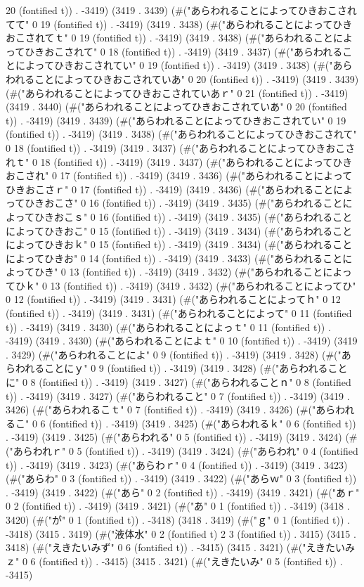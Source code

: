 20 (fontified t)) . -3419) (3419 . 3439) (#("あらわれることによってひきおこされてて" 0 19 (fontified t)) . -3419) (3419 . 3438) (#("あらわれることによってひきおこされてｔ" 0 19 (fontified t)) . -3419) (3419 . 3438) (#("あらわれることによってひきおこされて" 0 18 (fontified t)) . -3419) (3419 . 3437) (#("あらわれることによってひきおこされてい" 0 19 (fontified t)) . -3419) (3419 . 3438) (#("あらわれることによってひきおこされていあ" 0 20 (fontified t)) . -3419) (3419 . 3439) (#("あらわれることによってひきおこされていあｒ" 0 21 (fontified t)) . -3419) (3419 . 3440) (#("あらわれることによってひきおこされていあ" 0 20 (fontified t)) . -3419) (3419 . 3439) (#("あらわれることによってひきおこされてい" 0 19 (fontified t)) . -3419) (3419 . 3438) (#("あらわれることによってひきおこされて" 0 18 (fontified t)) . -3419) (3419 . 3437) (#("あらわれることによってひきおこされｔ" 0 18 (fontified t)) . -3419) (3419 . 3437) (#("あらわれることによってひきおこされ" 0 17 (fontified t)) . -3419) (3419 . 3436) (#("あらわれることによってひきおこさｒ" 0 17 (fontified t)) . -3419) (3419 . 3436) (#("あらわれることによってひきおこさ" 0 16 (fontified t)) . -3419) (3419 . 3435) (#("あらわれることによってひきおこｓ" 0 16 (fontified t)) . -3419) (3419 . 3435) (#("あらわれることによってひきおこ" 0 15 (fontified t)) . -3419) (3419 . 3434) (#("あらわれることによってひきおｋ" 0 15 (fontified t)) . -3419) (3419 . 3434) (#("あらわれることによってひきお" 0 14 (fontified t)) . -3419) (3419 . 3433) (#("あらわれることによってひき" 0 13 (fontified t)) . -3419) (3419 . 3432) (#("あらわれることによってひｋ" 0 13 (fontified t)) . -3419) (3419 . 3432) (#("あらわれることによってひ" 0 12 (fontified t)) . -3419) (3419 . 3431) (#("あらわれることによってｈ" 0 12 (fontified t)) . -3419) (3419 . 3431) (#("あらわれることによって" 0 11 (fontified t)) . -3419) (3419 . 3430) (#("あらわれることによっｔ" 0 11 (fontified t)) . -3419) (3419 . 3430) (#("あらわれることによｔ" 0 10 (fontified t)) . -3419) (3419 . 3429) (#("あらわれることによ" 0 9 (fontified t)) . -3419) (3419 . 3428) (#("あらわれることにｙ" 0 9 (fontified t)) . -3419) (3419 . 3428) (#("あらわれることに" 0 8 (fontified t)) . -3419) (3419 . 3427) (#("あらわれることｎ" 0 8 (fontified t)) . -3419) (3419 . 3427) (#("あらわれること" 0 7 (fontified t)) . -3419) (3419 . 3426) (#("あらわれるこｔ" 0 7 (fontified t)) . -3419) (3419 . 3426) (#("あらわれるこ" 0 6 (fontified t)) . -3419) (3419 . 3425) (#("あらわれるｋ" 0 6 (fontified t)) . -3419) (3419 . 3425) (#("あらわれる" 0 5 (fontified t)) . -3419) (3419 . 3424) (#("あらわれｒ" 0 5 (fontified t)) . -3419) (3419 . 3424) (#("あらわれ" 0 4 (fontified t)) . -3419) (3419 . 3423) (#("あらわｒ" 0 4 (fontified t)) . -3419) (3419 . 3423) (#("あらわ" 0 3 (fontified t)) . -3419) (3419 . 3422) (#("あらｗ" 0 3 (fontified t)) . -3419) (3419 . 3422) (#("あら" 0 2 (fontified t)) . -3419) (3419 . 3421) (#("あｒ" 0 2 (fontified t)) . -3419) (3419 . 3421) (#("あ" 0 1 (fontified t)) . -3419) (3418 . 3420) (#("が" 0 1 (fontified t)) . -3418) (3418 . 3419) (#("ｇ" 0 1 (fontified t)) . -3418) (3415 . 3419) (#("液体水" 0 2 (fontified t) 2 3 (fontified t)) . 3415) (3415 . 3418) (#("えきたいみず" 0 6 (fontified t)) . -3415) (3415 . 3421) (#("えきたいみｚ" 0 6 (fontified t)) . -3415) (3415 . 3421) (#("えきたいみ" 0 5 (fontified t)) . -3415) 